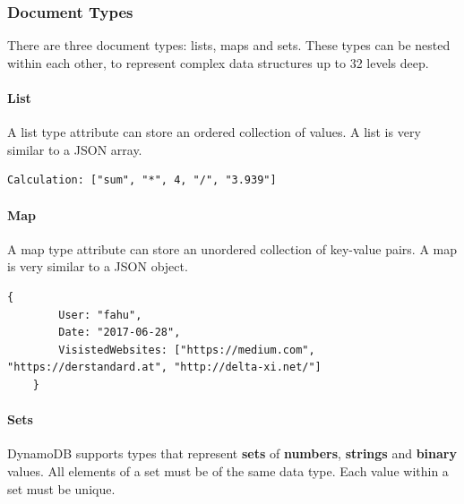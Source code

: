 \subsubsection{Document Types}
There are three document types: lists, maps and sets. These types can be nested within each other, to represent complex data structures up to 32 levels deep.

\paragraph{List}A list type attribute can store an ordered collection of values. A list is very similar to a JSON array.

\begin{lstlisting}[caption={Example of a DynamoDB list}, captionpos=b]
	Calculation: ["sum", "*", 4, "/", "3.939"]
\end{lstlisting}

\paragraph{Map}A map type attribute can store an unordered collection of key-value pairs. A map is very similar to a JSON object.
\begin{lstlisting}[caption={Example of a DynamoDB map}, captionpos=b]
	{
		User: "fahu",
		Date: "2017-06-28",
		VisistedWebsites: ["https://medium.com", "https://derstandard.at", "http://delta-xi.net/"]
	}
\end{lstlisting}

\paragraph{Sets}DynamoDB supports types that represent \textbf{sets} of \textbf{numbers}, \textbf{strings} and \textbf{binary} values. All elements of a set must be of the same data type. Each value within a set must be unique.

